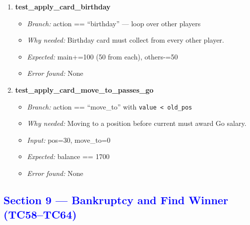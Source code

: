 \documentclass{article}
\begin{document}
\begin{enumerate}[resume, label=\textbf{TC\arabic*.}]
  \item \textbf{test\_apply\_card\_birthday}
  \begin{itemize}[noitemsep]
    \item \textit{Branch:} action == ``birthday'' — loop over other players
    \item \textit{Why needed:} Birthday card must collect from every other player.
    \item \textit{Expected:} main+=100 (50 from each), others-=50
    \item \textit{Error found:} None
  \end{itemize}

  \item \textbf{test\_apply\_card\_move\_to\_passes\_go}
  \begin{itemize}[noitemsep]
    \item \textit{Branch:} action == ``move\_to'' with \texttt{value < old\_pos}
    \item \textit{Why needed:} Moving to a position before current must award Go salary.
    \item \textit{Input:} pos=30, move\_to=0
    \item \textit{Expected:} balance == 1700
    \item \textit{Error found:} None
  \end{itemize}

\end{enumerate}

\subsection*{\textcolor{blue}{Section 9 — Bankruptcy and Find Winner (TC58--TC64)}}
\end{document}
